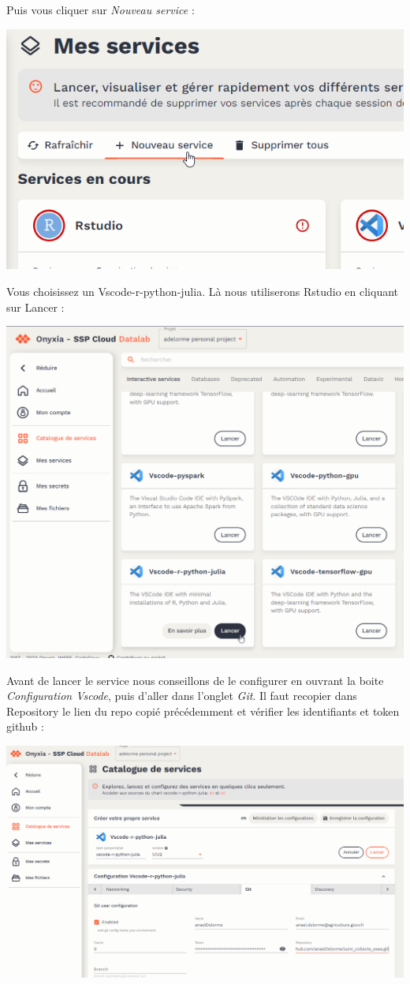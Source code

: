 \documentclass[
  letterpaper,
  DIV=11,
  numbers=noendperiod]{scrreprt}
\begin{document}
Puis vous cliquer sur \emph{Nouveau service} :

\includegraphics{./images/datalab_nouveau_service.png}

Vous choisissez un Vscode-r-python-julia. Là nous utiliserons Rstudio en
cliquant sur Lancer :

\includegraphics{./images/datalab_vscode_service.png}

Avant de lancer le service nous conseillons de le configurer en ouvrant
la boite \emph{Configuration Vscode}, puis d'aller dans l'onglet
\emph{Git}. Il faut recopier dans Repository le lien du repo copié
précédemment et vérifier les identifiants et token github :

\includegraphics{./images/conf_git_vscode.png}
\end{document}
